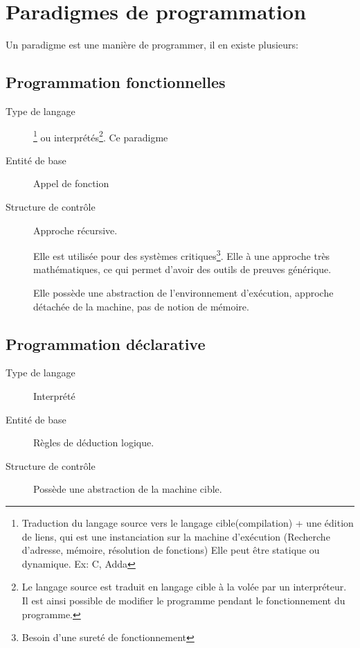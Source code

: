 \documentclass[12pt,a4paper,openany]{article}
\begin{document}
	\setcounter{tocdepth}{2}
	\setcounter{secnumdepth}{3}
	\maketitle
	\section{Paradigmes de programmation}
		Un paradigme est une manière de programmer, il en existe plusieurs: 
		\subsection{Programmation fonctionnelles}
		\begin{description}
		\item[Type de langage] \footnote{Traduction du langage source vers le langage cible(compilation) + une édition de liens, qui est une instanciation sur la machine d'exécution (Recherche d'adresse, mémoire, résolution de fonctions) Elle peut être statique ou dynamique. Ex: C, Adda} ou interprétés\footnote{
		Le langage source est traduit en langage cible à la volée par un interpréteur. Il est ainsi possible de modifier le programme pendant le fonctionnement du programme.}. Ce paradigme
		\item[Entité de base] Appel de fonction
		\item[Structure de contrôle] Approche récursive. 


		Elle est utilisée pour des systèmes critiques\footnote{Besoin d'une sureté de fonctionnement}. Elle à une approche très mathématiques, ce qui 
		permet d'avoir des outils de preuves générique.

		Elle possède une abstraction de l'environnement d'exécution, approche détachée de la machine, pas de notion de mémoire.

	\end{description}
		\subsection{Programmation déclarative}
		\begin{description}
			\item[Type de langage] Interprété
			\item[Entité de base] Règles de déduction logique.
			\item[Structure de contrôle  ]
			Possède une abstraction de la machine cible.
		\end{description}
\end{document}
